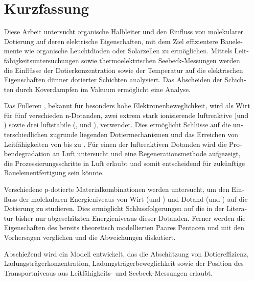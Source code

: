 \section*{Kurzfassung}
\begin{otherlanguage}{ngerman}
Diese Arbeit untersucht organische Halbleiter und den Einfluss von molekularer Dotierung auf deren elektrische Eigenschaften, mit dem Ziel effizientere Bauelemente wie organische Leuchtdioden oder Solarzellen zu ermöglichen.
Mittels Leitfähigkeitsuntersuchungen sowie thermoelektrischen Seebeck-Messungen werden die Einflüsse der Dotierkonzentration sowie der Temperatur auf die elektrischen Eigenschaften dünner dotierter Schichten analysiert.
Das Abscheiden der Schichten durch Koverdampfen im Vakuum ermöglicht eine \insitu Analyse.

Das Fulleren \CS, bekannt für besonders hohe Elektronenbeweglichkeit, wird als Wirt für fünf verschieden n-Dotanden, zwei extrem stark ionisierende luftreaktive (\CrPd und \WPd) sowie drei luftstabile (\aob, \dmbi und \meodmbiI), verwendet. Dies ermöglicht Schlüsse auf die unterschiedlichen zugrunde liegenden Dotiermechanismen und das Erreichen von Leitfähigkeiten von bis zu .
Für einen der luftreaktiven Dotanden wird die Probendegradation an Luft untersucht und eine Regenerationsmethode aufgezeigt, die Prozessierungsschritte in Luft erlaubt und somit entscheidend für zukünftige Bauelementfertigung sein könnte.

Verschiedene p-dotierte Materialkombinationen werden untersucht, um den Einfluss der molekularen Energieniveaus von Wirt (\meo und \lili) und Dotand (\FS und \CSF) auf die Dotierung zu studieren. Dies ermöglicht Schlussfolgerungen auf die in der Literatur bisher nur abgeschätzten Energieniveaus dieser Dotanden.
Ferner werden die Eigenschaften des bereits theoretisch modellierten Paares Pentacen und \FV mit den Vorhersagen verglichen und die Abweichungen diskutiert.

Abschießend wird ein Modell entwickelt, das die Abschätzung von Dotiereffizienz, Ladungsträgerkonzentration, Ladungsträgerbeweglichkeit sowie der Position des Transportniveaus aus Leitfähigkeits- und Seebeck-Messungen erlaubt.
\end{otherlanguage}